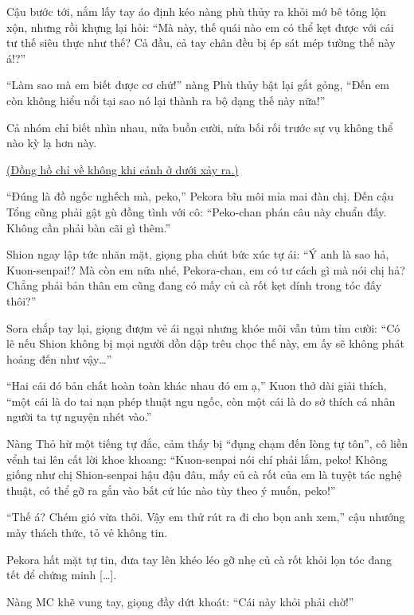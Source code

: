 \documentclass[../main.tex]{subfiles}
\begin{document}
Cậu bước tới, nắm lấy tay áo định kéo nàng phù thủy ra khỏi mớ bê tông lộn xộn, nhưng rồi khựng lại hỏi: ``Mà này, thế quái nào em có thể kẹt được với cái tư thế siêu thực như thế? Cả đầu, cả tay chân đều bị ép sát mép tường thế này á!?''

``Làm sao mà em biết được cơ chứ!'' nàng Phù thủy bật lại gắt gỏng, ``Đến em còn không hiểu nổi tại sao nó lại thành ra bộ dạng thế này nữa!''

Cả nhóm chỉ biết nhìn nhau, nửa buồn cười, nửa bối rối trước sự vụ không thể nào kỳ lạ hơn này.

\begin{center}
  \uline{(Đồng hồ chỉ về không khi cảnh ở dưới xảy ra.)}
\end{center}

``Đúng là đồ ngốc nghếch mà, peko,'' Pekora bĩu môi mỉa mai đàn chị. Đến cậu Tổng cũng phải gật gù đồng tình với cô: ``Peko-chan phán câu này chuẩn đấy. Không cần phải bàn cãi gì thêm.''

Shion ngay lập tức nhăn mặt, giọng pha chút bức xúc tự ái: ``Ý anh là sao hả, Kuon-senpai!? Mà còn em nữa nhé, Pekora-chan, em có tư cách gì mà nói chị hả? Chẳng phải bản thân em cũng đang có mấy củ cà rốt kẹt dính trong tóc đấy thôi?''

Sora chắp tay lại, giọng đượm vẻ ái ngại nhưng khóe môi vẫn tủm tỉm cười: ``Có lẽ nếu Shion không bị mọi người dồn dập trêu chọc thế này, em ấy sẽ không phát hoảng đến như vậy\dots''


``Hai cái đó bản chất hoàn toàn khác nhau đó em ạ,'' Kuon thở dài giải thích, ``một cái là do tai nạn phép thuật ngu ngốc, còn một cái là do sở thích cá nhân người ta tự nguyện nhét vào.''

Nàng Thỏ hừ một tiếng tự đắc, cảm thấy bị ``đụng chạm đến lòng tự tôn'', cô liền vểnh tai lên cất lời khoe khoang: ``Kuon-senpai nói chí phải lắm, peko! Không giống như chị Shion-senpai hậu đậu đâu, mấy củ cà rốt của em là tuyệt tác nghệ thuật, có thể gỡ ra gắn vào bất cứ lúc nào tùy theo ý muốn, peko!''

``Thế á? Chém gió vừa thôi. Vậy em thử rút ra đi cho bọn anh xem,'' cậu nhướng mày thách thức, tỏ vẻ không tin.

Pekora hất mặt tự tin, đưa tay lên khéo léo gỡ nhẹ củ cà rốt khỏi lọn tóc đang tết để chứng minh [\dots].


Nàng MC khẽ vung tay, giọng đầy dứt khoát: ``Cái này khỏi phải chờ!''
\end{document}

